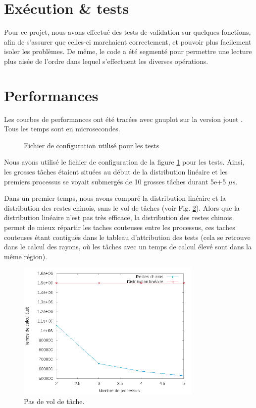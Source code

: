 \section{Exécution \& tests} %
\label{sec:execution}

Pour ce projet, nous avons effectué des tests de validation sur quelques fonctions, afin de s'assurer que celles-ci marchaient correctement, et pouvoir plus facilement isoler les problèmes. 
De même, le code a été segmenté pour permettre une lecture plus aisée de l'ordre dans lequel s'effectuent les diverses opérations.

\section{Performances} %
\label{sec:perf}

Les courbes de performances ont été tracées avec gnuplot sur la version \og jouet \fg. Tous les temps sont en microsecondes.

\begin{figure}[H]
\centering

\caption{Fichier de configuration utilisé pour les tests}
\label{fig:conf}
\end{figure}
Nous avons utilisé le fichier de configuration de la figure \ref{fig:conf} pour les tests. Ainsi, les grosses tâches étaient situées au début de la distribution linéaire et les premiers processus se voyait submergés de 10 grosses tâches durant 5e+5 $\mu s$. 

Dans un premier temps, nous avons comparé la distribution linéaire et la distribution des restes chinois, sans le vol de tâches (voir Fig. \ref{comp_chinois_lin}). Alors que la distribution linéaire n'est pas très efficace, la distribution des restes chinois permet de mieux répartir les taches couteuses entre les processus, ces taches couteuses étant contiguës dans le tableau d'attribution des tests (cela se retrouve dans le calcul des rayons, où les tâches avec un temps de calcul élevé sont dans la même région).\\

\begin{figure}[H]
\centering
\includegraphics[width=0.8\textwidth]{comp_chinois_lin.png}
\caption{Pas de vol de tâche.}
\label{comp_chinois_lin}
\end{figure}


